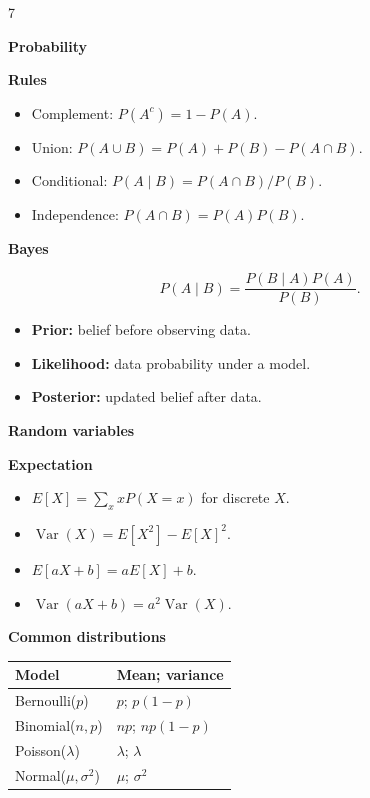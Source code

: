 \documentclass[a4paper,landscape]{article}
\newcommand{\hlhighlight}[1]{\par\smallskip\noindent\colorbox{banner}{\strut\textbf{#1}}\par}
\newcommand{\sectitle}[1]{\par\smallskip\noindent\textcolor{section}{\textbf{#1}}\par}
\newcommand{\category}[1]{\textcolor{category}{\textbf{#1}}}
\begin{document}
\begin{multicols}{7}
\hlhighlight{Probability}
\sectitle{Rules}
\begin{itemize}
\item Complement: $P(A^c)=1-P(A)$.
\item Union: $P(A\cup B)=P(A)+P(B)-P(A\cap B)$.
\item Conditional: $P(A\mid B)=P(A\cap B)/P(B)$.
\item Independence: $P(A\cap B)=P(A)P(B)$.
\end{itemize}
\sectitle{Bayes}
\[
P(A\mid B)=\frac{P(B\mid A)P(A)}{P(B)}.
\]
\begin{itemize}
\item \category{Prior:} belief before observing data.
\item \category{Likelihood:} data probability under a model.
\item \category{Posterior:} updated belief after data.
\end{itemize}

\hlhighlight{Random variables}
\sectitle{Expectation}
\begin{itemize}
\item $E[X]=\sum_xxP(X=x)$ for discrete $X$.
\item $\operatorname{Var}(X)=E[X^2]-E[X]^2$.
\item $E[aX+b]=aE[X]+b$.
\item $\operatorname{Var}(aX+b)=a^2\operatorname{Var}(X)$.
\end{itemize}
\sectitle{Common distributions}
\begin{tabular}{@{}ll@{}}
\toprule
Model & Mean; variance\\
\midrule
Bernoulli($p$) & $p$; $p(1-p)$\\
Binomial($n,p$) & $np$; $np(1-p)$\\
Poisson($\lambda$) & $\lambda$; $\lambda$\\
Normal($\mu,\sigma^2$) & $\mu$; $\sigma^2$\\
\bottomrule
\end{tabular}


\end{multicols}
\end{document}
